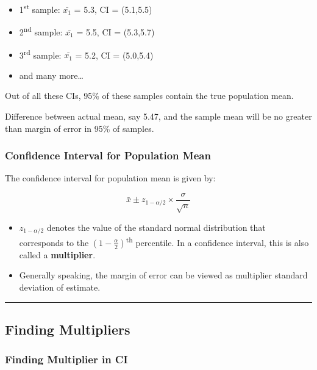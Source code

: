 \documentclass[
  openany]{book}
\providecommand{\tightlist}{%
  \setlength{\itemsep}{0pt}\setlength{\parskip}{0pt}}
\begin{document}
\begin{itemize}
\tightlist
\item
  1\textsuperscript{st} sample: \(\bar{x_1}\) = 5.3, CI = (5.1,5.5)
\item
  2\textsuperscript{nd} sample: \(\bar{x_1}\) = 5.5, CI = (5.3,5.7)
\item
  3\textsuperscript{rd} sample: \(\bar{x_1}\) = 5.2, CI = (5.0,5.4)
\item
  and many more\ldots{}
\end{itemize}

Out of all these CIs, 95\% of these samples contain the true population mean.

Difference between actual mean, say 5.47, and the sample mean will be no greater than margin of error in 95\% of samples.

\subsubsection{Confidence Interval for Population Mean}\label{confidence-interval-for-population-mean}

The confidence interval for population mean is given by:

\begin{equation}
\bar{x}\pm z_{1-\alpha/2} \times \frac{\sigma}{\sqrt{n}}
\label{eq:cipop}
\end{equation}

\begin{itemize}
\tightlist
\item
  \(z_{1-\alpha/2}\) denotes the value of the standard normal distribution that corresponds to the \((1-\frac{\alpha}{2})\)\textsuperscript{th} percentile. In a confidence interval, this is also called a \textbf{multiplier}.
\item
  Generally speaking, the margin of error can be viewed as multiplier \times standard deviation of estimate.
\end{itemize}

\begin{center}\rule{0.5\linewidth}{0.5pt}\end{center}

\subsection{Finding Multipliers}\label{finding-multipliers}

\subsubsection{Finding Multiplier in CI}\label{finding-multiplier-in-ci}
\end{document}
